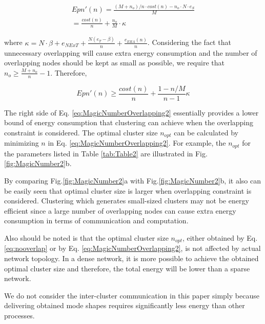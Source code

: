 \begin{align}
\label{eq:MagicNumberOverlapping}
Epn'(n) = \frac{(M+n_o)/n \cdot cost(n)- n_o \cdot N \cdot e_S}{M}\\ \nonumber
=\frac{cost(n)}{n}  + \frac{n_o}{M} \cdot \kappa
\end{align}

where \(\kappa = N \cdot \beta + e_{NExT}+ \frac{N(e_T-\beta)}{n} + \frac{e_{ERA}(n)}{n}\).  Considering the fact that unnecessary overlapping will cause extra energy consumption and the number of overlapping nodes should be kept as small as possible, we require that \(n_o \geq \frac{M+n_o}{n} -1\). Therefore,

\begin{equation}
\label{eq:MagicNumberOverlapping2}
Epn'(n) \geq \frac{cost(n)}{n}+ \frac{1-n/M}{n-1}\kappa
\end{equation}

The right side of Eq. \ref{eq:MagicNumberOverlapping2} essentially provides a lower bound of energy consumption that clustering can achieve when the overlapping constraint is considered. The optimal cluster size \(n_{opt}\) can be calculated by minimizing \(n\) in Eq. \ref{eq:MagicNumberOverlapping2}.  For example, the \(n_{opt}\) for the parameters listed in Table \ref{tab:Table2} are illustrated in Fig. \ref{fig:MagicNumber2}b. 

By comparing Fig.\ref{fig:MagicNumber2}a with Fig.\ref{fig:MagicNumber2}b, it also can be easily seen that optimal cluster size is larger when overlapping constraint is considered. Clustering which generates small-sized clusters may not be energy efficient since a large number of overlapping nodes can cause extra energy consumption in terms of communication and computation. 

Also should be noted is that the optimal cluster size \(n_{opt}\), either obtained by Eq. \ref{eq:nooverlap} or by Eq. \ref{eq:MagicNumberOverlapping2}, is not affected by actual network topology. In a dense network, it is more possible to achieve the obtained optimal cluster size and therefore, the total energy will be lower than a sparse network.

We do not consider the inter-cluster communication in this paper simply because delivering obtained mode shapes requires significantly less energy than other processes.

